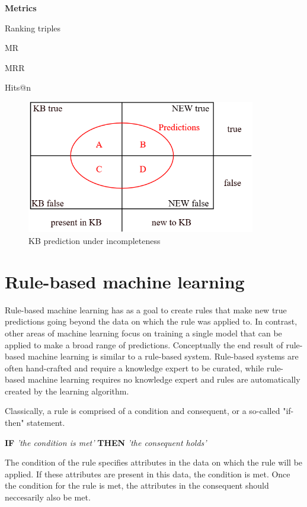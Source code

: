 \textbf{Metrics}

    Ranking triples

    MR

    MRR

    Hits@n
    
    
\begin{figure}[htp]
    \centering
    \includegraphics[width=10cm]{figures/kb_venn.png}
    \caption{KB prediction under incompleteness}
\end{figure}


\section{Rule-based machine learning}
Rule-based machine learning has as a goal to create rules that make new true predictions going beyond the data on which the rule was applied to. In contrast, other areas of machine learning focus on training a single model that can be applied to make a broad range of predictions. Conceptually the end result of rule-based machine learning is similar to a rule-based system.  Rule-based systems are often hand-crafted and require a knowledge expert to be curated, while rule-based machine learning requires no knowledge expert and rules are automatically created by the learning algorithm.

Classically, a rule is comprised of a condition and consequent, or a so-called "if-then" statement. \begin{center} \textbf{IF} \textit{'the condition is met'} \textbf{THEN} \textit{'the consequent holds'} \end{center}
The condition of the rule specifies attributes in the data on which the rule will be applied. If these attributes are present in this data, the condition is met. Once the condition for the rule is met, the attributes in the consequent should neccesarily also be met.

